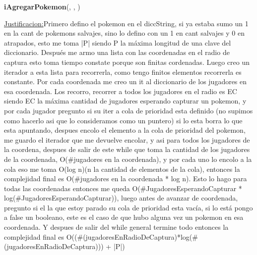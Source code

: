 \begin{Algoritmos}
\begin{algorithm}[H]{\textbf{iAgregarPokemon}(, , )}
\begin{algorithmic}[1]
		\Statex \underline{Justificacion:}Primero defino el pokemon en el diccString, si ya estaba sumo un 1 en la cant de pokemons salvajes, sino lo defino con un 1 en cant salvajes y 0 en atrapados, esto me toma |P| siendo P la máxima longitud de una clave del diccionario. Después me armo una lista con las coordenadas en el radio de captura esto toma tiempo constate porque son finitas cordenadas. Luego creo un iterador a esta lista para recorrerla, como tengo finitos elementos recorrerla es constante. Por cada coordenada me creo un it al diccionario de los jugadores en esa coordenada. Los recorro, recorrer a todos los jugadores en el radio es EC siendo EC la máxima cantidad de jugadores esperando capturar un pokemon, y por cada jugador pregunto si su iter a cola de prioridad esta definido (no supimos como hacerlo asi que lo consideramos como un puntero) si lo esta borra lo que esta apuntando, despues encolo el elemento a la cola de prioridad del pokemon, me guardo el iterador que me devuelve encolar, y asi para todos los jugadores de la coordena, despues de salir de este while que toma la cantidad de los jugadores de la coordenada, O(#jugadores en la coordenada), y por cada uno lo encolo a la cola eso me toma O(log n)(n la cantidad de elementos de la cola), entonces la complejidad final es O(#jugadores en la coordenada * log n). Esto lo hago para todas las coordenadas entonces me queda O(#JugadoresEsperandoCapturar * log(#JugadoresEsperandoCapturar)), luego antes de avanzar de coordenada, pregunto si el la que estoy parado su cola de prioridad esta vacía, si lo está pongo a false un booleano, este es el caso de que hubo alguna vez un pokemon en esa coordenada. Y despues de salir del while general termine todo entonces la complejidad final es O((#(jugadoresEnRadioDeCaptura)*log(#(jugadoresEnRadioDeCaptura))) + |P|) 
	\end{algorithmic}
\end{algorithm}


\end{Algoritmos}
